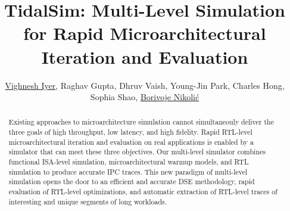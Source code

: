 \documentclass[sigplan,nonacm,10pt]{acmart}
\begin{document}
\title{TidalSim: Multi-Level Simulation for Rapid Microarchitectural Iteration and Evaluation}


\author{\href{https://orcid.org/0000-0001-6934-6577}{Vighnesh Iyer}, Raghav Gupta, Dhruv Vaish, Young-Jin Park, Charles Hong, Sophia Shao, \href{https://orcid.org/0000-0003-2324-1715}{Borivoje Nikolić}}



\renewcommand{\shortauthors}{Iyer, Vighnesh et al.}

\begin{abstract}


Existing approaches to microarchitecture simulation cannot simultaneouly deliver the three goals of high throughput, low latency, and high fidelity.
Rapid RTL-level microarchitectural iteration and evaluation on real applications is enabled by a simulator that can meet these three objectives.
Our multi-level simulator combines functional ISA-level simulation, microarchitectural warmup models, and RTL simulation to produce accurate IPC traces.
This new paradigm of multi-level simulation opens the door to an efficient and accurate DSE methodology, rapid evaluation of RTL-level optimizations, and automatic extraction of RTL-level traces of interesting and unique segments of long workloads.

\end{abstract}
\end{document}
